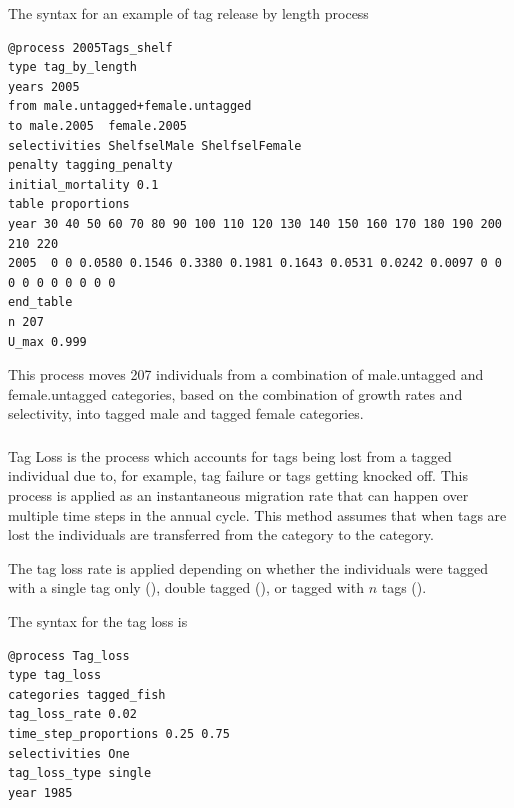 The syntax for an example of tag release by length process

{\small{\begin{verbatim}
@process 2005Tags_shelf
type tag_by_length
years 2005
from male.untagged+female.untagged
to male.2005  female.2005
selectivities ShelfselMale ShelfselFemale
penalty tagging_penalty
initial_mortality 0.1
table proportions
year 30 40 50 60 70 80 90 100 110 120 130 140 150 160 170 180 190 200 210 220
2005  0 0 0.0580 0.1546 0.3380 0.1981 0.1643 0.0531 0.0242 0.0097 0 0 0 0 0 0 0 0 0 0
end_table
n 207
U_max 0.999
\end{verbatim}}}

This process moves 207 individuals from a combination of male.untagged and female.untagged categories, based on the combination of growth rates and selectivity, into tagged male and tagged female categories.

\subsubsection{}\label{sec:Process-TagLoss} 

Tag Loss is the process which accounts for tags being lost from a tagged individual due to, for example, tag failure or tags getting knocked off. This process is applied as an instantaneous migration rate that can happen over multiple time steps in the annual cycle. This method assumes that when tags are lost the individuals are transferred from the  category to the  category.

The tag loss rate is applied depending on whether the individuals were tagged with a single tag only (), double tagged (), or tagged with $n$ tags ().

The syntax for the tag loss is

{\small{\begin{verbatim}
@process Tag_loss
type tag_loss
categories tagged_fish
tag_loss_rate 0.02
time_step_proportions 0.25 0.75
selectivities One
tag_loss_type single
year 1985
\end{verbatim}}}

\subsection{\label{sec:DerivedQuantity}}

